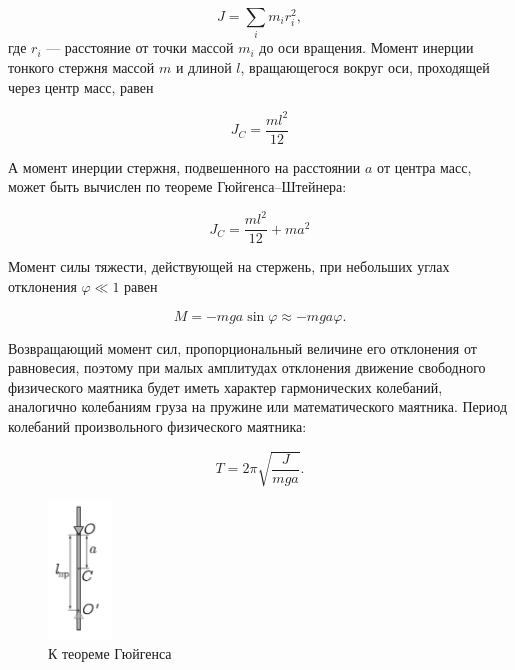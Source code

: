 \documentclass[a4paper,12pt]{article}
\begin{document}
\begin{equation}\label{moment_inercii}
J = \sum_i m_ir_i^2,
\end{equation}
где $r_i$ — расстояние от точки массой $m_i$ до оси вращения.  Момент
инерции тонкого стержня массой $m$ и длиной $l$, вращающегося вокруг оси,
проходящей через центр масс, равен

\begin{equation}\label{moment_inercii_sterjnya}
J_C = \dfrac{ml^2}{12}
\end{equation}

А момент инерции стержня, подвешенного на расстоянии $a$ от центра масс,
может быть вычислен по теореме Гюйгенса–Штейнера:

\begin{equation}\label{moment_inercii_sterjnya}
J_C = \dfrac{ml^2}{12} + ma^2
\end{equation}


Момент силы тяжести, действующей на стержень, при небольших углах отклонения $\varphi \ll 1$ равен

\begin{equation}\label{moment_sili_mayatnika}
M = -mga \sin \varphi \approx -mga \varphi.
\end{equation}


Возвращающий момент сил, пропорциональный величине его отклонения от равновесия, поэтому при малых амплитудах отклонения движение свободного физического маятника будет иметь характер гармонических колебаний, аналогично колебаниям груза на пружине или математического маятника. Период колебаний произвольного физического маятника:

\begin{equation}\label{period_kolebaniy_proizvolnogo_mayatnika}
T = 2\pi\sqrt{\dfrac{J}{mga}}.
\end{equation}


\begin{figure}
\includegraphics[width=0.15\textwidth]{prived_dlina.png}
\caption{К теореме Гюйгенса} \label{prived_dlina_photo}
\end{figure}
\end{document}
